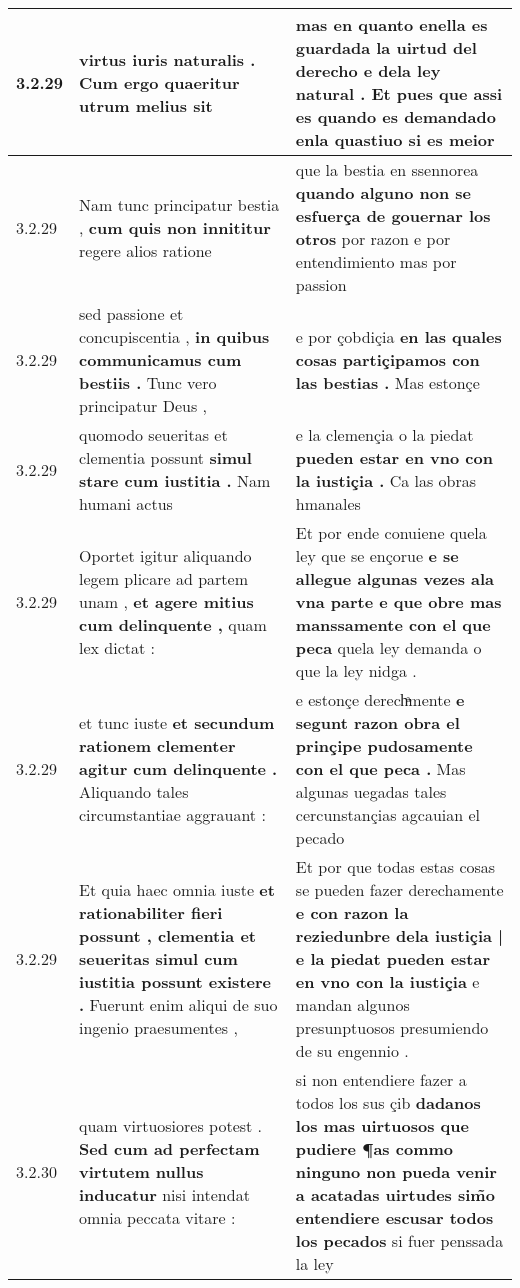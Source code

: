 \begin{tabular}{|p{1cm}|p{6.5cm}|p{6.5cm}|}
3.2.29 & virtus iuris naturalis . \textbf{ Cum ergo quaeritur } utrum melius sit & mas en quanto enella es guardada la uirtud del derecho e dela ley natural . \textbf{ Et pues que assi es quando es demandado enla quastiuo } si es meior \\\hline
3.2.29 & Nam tunc principatur bestia , \textbf{ cum quis non innititur } regere alios ratione & que la bestia en ssennorea \textbf{ quando alguno non se esfuerça de gouernar los otros } por razon e por entendimiento mas por passion \\\hline
3.2.29 & sed passione et concupiscentia , \textbf{ in quibus communicamus cum bestiis . } Tunc vero principatur Deus , & e por çobdiçia \textbf{ en las quales cosas partiçipamos con las bestias . } Mas estonçe \\\hline
3.2.29 & quomodo seueritas et clementia possunt \textbf{ simul stare cum iustitia . } Nam humani actus & e la clemençia o la piedat \textbf{ pueden estar en vno con la iustiçia . } Ca las obras hmanales \\\hline
3.2.29 & Oportet igitur aliquando legem plicare ad partem unam , \textbf{ et agere mitius cum delinquente , } quam lex dictat : & Et por ende conuiene quela ley que se ençorue \textbf{ e se allegue algunas vezes ala vna parte e que obre mas manssamente con el que peca } quela ley demanda o que la ley nidga . \\\hline
3.2.29 & et tunc iuste \textbf{ et secundum rationem clementer agitur cum delinquente . } Aliquando tales circumstantiae aggrauant : & e estonçe derechͣmente \textbf{ e segunt razon obra el prinçipe pudosamente con el que peca . } Mas algunas uegadas tales cercunstançias agcauian el pecado \\\hline
3.2.29 & Et quia haec omnia iuste \textbf{ et rationabiliter fieri possunt , clementia et seueritas simul cum iustitia possunt existere . } Fuerunt enim aliqui de suo ingenio praesumentes , & Et por que todas estas cosas se pueden fazer derechamente \textbf{ e con razon la reziedunbre dela iustiçia | e la piedat pueden estar en vno con la iustiçia } e mandan algunos presunptuosos presumiendo de su engennio . \\\hline
3.2.30 & quam virtuosiores potest . \textbf{ Sed cum ad perfectam virtutem nullus inducatur } nisi intendat omnia peccata vitare : & si non entendiere fazer a todos los sus çib \textbf{ dadanos los mas uirtuosos que pudiere ¶as commo ninguno non pueda venir a acatadas uirtudes sim̃o entendiere escusar todos los pecados } si fuer penssada la ley \\\hline

\end{tabular}
